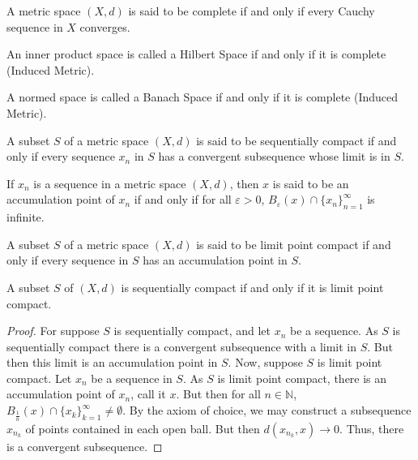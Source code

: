 \documentclass[crop=false,class=book,oneside]{standalone}
\begin{document}
            \begin{definition}
            A metric space $(X,d)$ is said to be complete if and only if every Cauchy sequence in $X$ converges.
            \end{definition}
            \begin{definition}
            An inner product space is called a Hilbert Space if and only if it is complete (Induced Metric).
            \end{definition}
            \begin{definition}
            A normed space is called a Banach Space if and only if it is complete (Induced Metric).
            \end{definition}
            \begin{definition}
            A subset $S$ of a metric space $(X,d)$ is said to be sequentially compact if and only if every sequence $x_n$ in $S$ has a convergent subsequence whose limit is in $S$.
            \end{definition}
            \begin{definition}
            If $x_n$ is a sequence in a metric space $(X,d)$, then $x$ is said to be an accumulation point of $x_n$ if and only if for all $\varepsilon>0$, $B_{\varepsilon}(x)\cap \{x_n\}_{n=1}^{\infty}$ is infinite.
            \end{definition}
            \begin{definition}
            A subset $S$ of a metric space $(X,d)$ is said to be limit point compact if and only if every sequence in $S$ has an accumulation point in $S$.
            \end{definition}
            \begin{theorem}
            A subset $S$ of $(X,d)$ is sequentially compact if and only if it is limit point compact.
            \end{theorem}
            \begin{proof}
            For suppose $S$ is sequentially compact, and let $x_n$ be a sequence. As $S$ is sequentially compact there is a convergent subsequence with a limit in $S$. But then this limit is an accumulation point in $S$. Now, suppose $S$ is limit point compact. Let $x_n$ be a sequence in $S$. As $S$ is limit point compact, there is an accumulation point of $x_n$, call it $x$. But then for all $n\in \mathbb{N}$, $B_{\frac{1}{n}}(x)\cap \{x_k\}_{k=1}^{\infty}\ne \emptyset$. By the axiom of choice, we may construct a subsequence $x_{n_k}$ of points contained in each open ball. But then $d(x_{n_k},x)\rightarrow 0$. Thus, there is a convergent subsequence.
            \end{proof}
\end{document}
